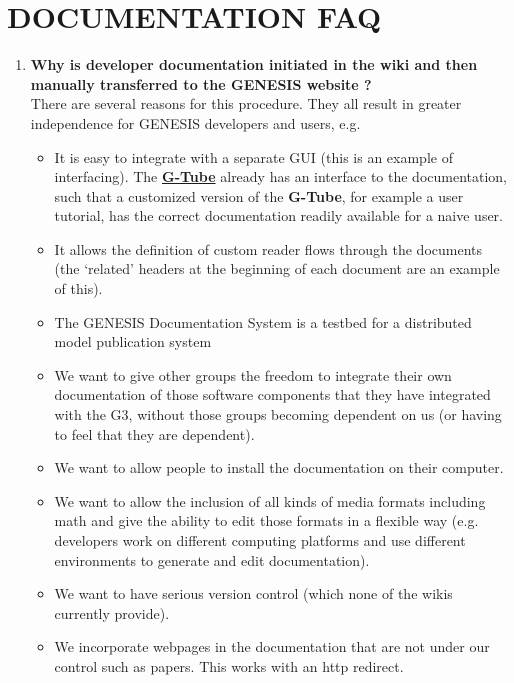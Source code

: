 \documentclass[12pt]{article}
\begin{document}
\section*{DOCUMENTATION FAQ}

\begin{enumerate}

\item {\bf Why is developer documentation initiated in the wiki and then manually transferred to the GENESIS website ?} \\
There are several reasons for this procedure. They all result in greater independence for GENESIS developers and users, e.g.

\begin{itemize}
\item It is easy to integrate with a separate GUI (this is an example of
interfacing).  The \href{../gtube/gtube.tex}{\bf G-Tube} already has an interface to the
documentation, such that a customized version of the {\bf G-Tube}, for example a
user tutorial, has the correct documentation readily available for a
naive user.

\item It allows the definition of custom reader flows through the
documents (the `related' headers at the beginning of each document are an
example of this).

\item The GENESIS Documentation System is a testbed for a distributed model publication system

\item We want to give other groups the freedom to integrate their own
documentation of those software components that they have integrated
with the G3, without those groups becoming dependent on us (or having
to feel that they are dependent).

\item We want to allow people to install the documentation on their computer.

\item We want to allow the inclusion of all kinds of media formats
including math and give the ability to edit those formats in a
flexible way (e.g. developers work on different computing platforms and use different
environments to generate and edit documentation).

\item We want to have serious version control (which none of the wikis
currently provide).

\item We incorporate webpages in the documentation that are not under our
control such as papers.  This works with an http redirect.


\end{itemize}
\end{enumerate}
\end{document}
